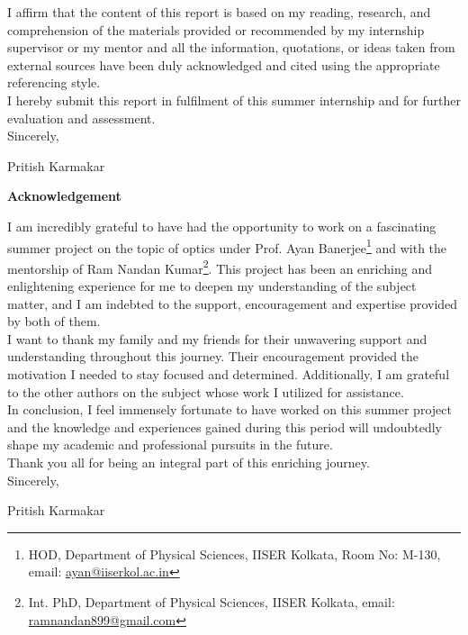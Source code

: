 \documentclass[11pt,a4paper]{article}
\numberwithin{equation}{section}
\begin{document}
\begin{titlepage}
		I affirm that the content of this report is based on my reading, research, and comprehension of the materials provided or recommended by my internship supervisor or my mentor and all the information, quotations, or ideas taken from external sources have been duly acknowledged and cited using the appropriate referencing style.\\
		
		I hereby submit this report in fulfilment of
		this summer internship and for further evaluation and assessment.\\
		
		Sincerely,
		
		{\LARGE Pritish Karmakar}\\
		
		
		\clearpage 
		
		{\Huge\bfseries Acknowledgement}\\
		\vspace{9mm}
		
		\Large
		I am incredibly grateful to have had the opportunity to work on a fascinating summer project on the topic of optics under  {Prof. Ayan Banerjee}\footnote{HOD, Department of Physical Sciences, IISER Kolkata, Room No: M-130, email: \href{mailto:ayan@iiserkol.ac.in}{ayan@iiserkol.ac.in}} and with the mentorship of {Ram Nandan Kumar}\footnote{Int. PhD, Department of Physical Sciences, IISER Kolkata, email: \href{mailto:ramnandan899@gmail.com}{ramnandan899@gmail.com}}. This project has been an enriching and enlightening experience for me to deepen my understanding of the subject matter, and I am indebted to the support, encouragement and expertise provided by both of them.\\
		
		I want to thank my family and my friends for their unwavering support and understanding throughout this journey. Their encouragement provided the motivation I needed to stay focused and determined. Additionally, I am grateful to the other authors on the subject whose work I utilized for assistance.\\
		
		In conclusion, I feel immensely fortunate to have worked on this summer project and the knowledge and experiences gained during this period will undoubtedly shape my academic and professional pursuits in the future.\\
		
		Thank you all for being an integral part of this enriching journey.\\

		
		Sincerely,
		
		{\LARGE Pritish Karmakar}
		\newpage
		
		
		\normalsize
		\tableofcontents
		\clearpage
		\listoffigures
		\listoftables
		
	\end{titlepage}
\end{document}

